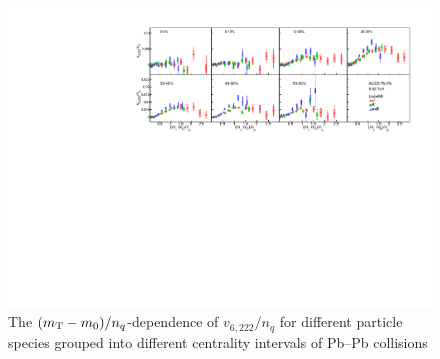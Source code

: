 \begin{figure}[htb]
\begin{center}
\includegraphics[scale=0.82]{figures/scaling/All_v6222_gap00_KET.pdf}
\end{center}
\caption{The $(m_{\rm{T}} - m_{0})/n_{q}$-dependence of $v_{6,222}/n_{q}$ for different particle species grouped into different centrality intervals of Pb--Pb collisions \sNN}
\label{v6222_KET}
\end{figure}